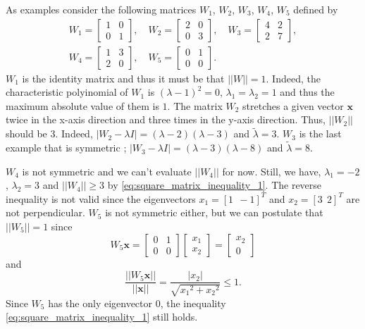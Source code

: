 \documentclass[11pt]{report}
\newcommand\bx{\ensuremath{\boldsymbol x}}
\begin{document}
As examples consider the following matrices \(W_1\), \(W_2\), \(W_3\), \(W_4\), \(W_5\) defined by
\begin{gather*}
W_1=\begin{bmatrix}
1&0\\0&1
\end{bmatrix},\quad
W_2=\begin{bmatrix}
2&0\\0&3
\end{bmatrix},\quad
W_3=\begin{bmatrix}
4&2\\2&7
\end{bmatrix},\\
W_4=\begin{bmatrix}
1&3\\2&0
\end{bmatrix},\quad
W_5=\begin{bmatrix}
0&1\\0&0
\end{bmatrix}.\quad
\end{gather*}
\(W_1\) is the identity matrix and thus it must be that \(||W||=1\).
Indeed, the characteristic polyinomial of \(W_1\) is \((\lambda-1)^2=0\), \(\lambda_1=\lambda_2=1\) and thus the maximum absolute value of them is \(1\).
The matrix \(W_2\) stretches a given vector \(\bx\) twice in the x-axis direction and three times in the y-axis direction.
Thus, \(||W_2||\) should be \(3\).
Indeed, \(|W_2-\lambda I|=(\lambda-2)(\lambda-3)\) and \(\tilde\lambda=3\).
\(W_3\) is the last example that is symmetric ; \(|W_3-\lambda I|=(\lambda-3)(\lambda-8)\) and \(\tilde\lambda=8\).

\(W_4\) is not symmetric and we can't evaluate \(||W_4||\) for now.
Still, we have, \(\lambda_1=-2\), \(\lambda_2=3\) and \(||W_4||\ge3\) by \eqref{eq:square_matrix_inequality_1}.
The reverse inequality is not valid since the eigenvectors \(x_1=[1\:\:-1]^T\) and \(x_2=[3\:\:2]^T\) are not perpendicular.
\(W_5\) is not symmetric either, but we can postulate that \(||W_5||=1\) since
\[
W_5\bx=
\begin{bmatrix}
0&1\\0&0
\end{bmatrix}
\begin{bmatrix}
x_1\\x_2
\end{bmatrix}
=
\begin{bmatrix}
x_2\\0
\end{bmatrix}
\]
and
\[
\frac{||W_5\bx||}{||\bx||}=\frac{|x_2|}{\sqrt{{x_1}^2+{x_2}^2}}\le 1.
\]
Since \(W_5\) has the only eigenvector \(0\), the inequality \eqref{eq:square_matrix_inequality_1} still holds.
\end{document}
